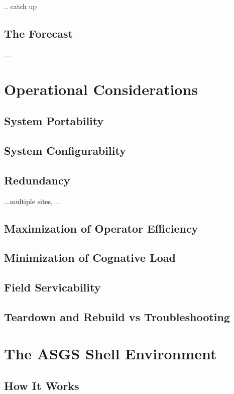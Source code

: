 \documentclass{article}
\begin{document}
.. catch up

\subsection{The Forecast}

....

\section{Operational Considerations}

\subsection{System Portability}

\subsection{System Configurability}

\subsection{Redundancy}

...multiple sites, ...

\subsection{Maximization of Operator Efficiency}

\subsection{Minimization of Cognative Load}

\subsection{Field Servicability}

\subsection{Teardown and Rebuild vs Troubleshooting}

\section{The ASGS Shell Environment}

\subsection{How It Works}
\end{document}
